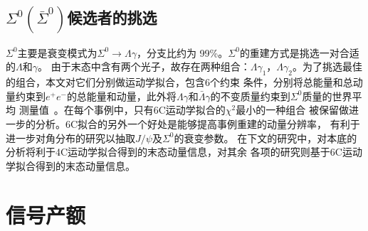 \subsection{$\Sigma^{0} (\bar{\Sigma}^{0})$候选者的挑选}
$\Sigma^{0}$主要是衰变模式为$\Sigma^{0} \to \Lambda \gamma$，分支比约为
99\%。$\Sigma^{0}$的重建方式是挑选一对合适的$\Lambda$和$\gamma$。
由于末态中含有两个光子，故存在两种组合：$\Lambda \gamma_{1}$，$\Lambda
\gamma_{2}$。为了挑选最佳的组合，本文对它们分别做运动学拟合，包含6个约束
条件，分别将总能量和总动量约束到$e^{+}e^{-}$的总能量和动量，此外将$\Lambda
\gamma$和$\bar{\Lambda} \gamma$的不变质量约束到$\Sigma^{0}$质量的世界平均
测量值~\cite{PDG}。在每个事例中，只有6C运动学拟合的$\chi^{2}$最小的一种组合
被保留做进一步的分析。6C拟合的另外一个好处是能够提高事例重建的动量分辨率，
有利于进一步对角分布的研究以抽取$J/\psi$及$\Sigma^{0}$的衰变参数。
在下文的研究中，对本底的分析将利于4C运动学拟合得到的末态动量信息，对其余
各项的研究则基于6C运动学拟合得到的末态动量信息。
\section{信号产额}
